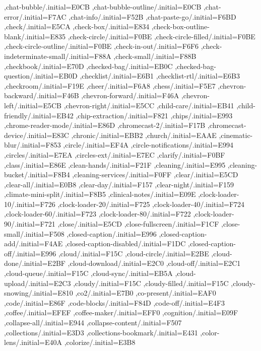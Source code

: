 { ,chat-bubble/.initial=E0CB
 ,chat-bubble-outline/.initial=E0CB
 ,chat-error/.initial=F7AC
 ,chat-info/.initial=F52B
 ,chat-paste-go/.initial=F6BD
 ,check/.initial=E5CA
 ,check-box/.initial=E834
 ,check-box-outline-blank/.initial=E835
 ,check-circle/.initial=F0BE
 ,check-circle-filled/.initial=F0BE
 ,check-circle-outline/.initial=F0BE
 ,check-in-out/.initial=F6F6
 ,check-indeterminate-small/.initial=F88A
 ,check-small/.initial=F88B
 ,checkbook/.initial=E70D
 ,checked-bag/.initial=EB0C
 ,checked-bag-question/.initial=EB0D
 ,checklist/.initial=E6B1
 ,checklist-rtl/.initial=E6B3
 ,checkroom/.initial=F19E
 ,cheer/.initial=F6A8
 ,chess/.initial=F5E7
 ,chevron-backward/.initial=F46B
 ,chevron-forward/.initial=F46A
 ,chevron-left/.initial=E5CB
 ,chevron-right/.initial=E5CC
 ,child-care/.initial=EB41
 ,child-friendly/.initial=EB42
 ,chip-extraction/.initial=F821
 ,chips/.initial=E993
 ,chrome-reader-mode/.initial=E86D
 ,chromecast-2/.initial=F17B
 ,chromecast-device/.initial=E83C
 ,chronic/.initial=EBB2
 ,church/.initial=EAAE
 ,cinematic-blur/.initial=F853
 ,circle/.initial=EF4A
 ,circle-notifications/.initial=E994
 ,circles/.initial=E7EA
 ,circles-ext/.initial=E7EC
 ,clarify/.initial=F0BF
 ,class/.initial=E86E
 ,clean-hands/.initial=F21F
 ,cleaning/.initial=E995
 ,cleaning-bucket/.initial=F8B4
 ,cleaning-services/.initial=F0FF
 ,clear/.initial=E5CD
 ,clear-all/.initial=E0B8
 ,clear-day/.initial=F157
 ,clear-night/.initial=F159
 ,climate-mini-split/.initial=F8B5
 ,clinical-notes/.initial=E09E
 ,clock-loader-10/.initial=F726
 ,clock-loader-20/.initial=F725
 ,clock-loader-40/.initial=F724
 ,clock-loader-60/.initial=F723
 ,clock-loader-80/.initial=F722
 ,clock-loader-90/.initial=F721
 ,close/.initial=E5CD
 ,close-fullscreen/.initial=F1CF
 ,close-small/.initial=F508
 ,closed-caption/.initial=E996
 ,closed-caption-add/.initial=F4AE
 ,closed-caption-disabled/.initial=F1DC
 ,closed-caption-off/.initial=E996
 ,cloud/.initial=F15C
 ,cloud-circle/.initial=E2BE
 ,cloud-done/.initial=E2BF
 ,cloud-download/.initial=E2C0
 ,cloud-off/.initial=E2C1
 ,cloud-queue/.initial=F15C
 ,cloud-sync/.initial=EB5A
 ,cloud-upload/.initial=E2C3
 ,cloudy/.initial=F15C
 ,cloudy-filled/.initial=F15C
 ,cloudy-snowing/.initial=E810
 ,co2/.initial=E7B0
 ,co-present/.initial=EAF0
 ,code/.initial=E86F
 ,code-blocks/.initial=F84D
 ,code-off/.initial=E4F3
 ,coffee/.initial=EFEF
 ,coffee-maker/.initial=EFF0
 ,cognition/.initial=E09F
 ,collapse-all/.initial=E944
 ,collapse-content/.initial=F507
 ,collections/.initial=E3D3
 ,collections-bookmark/.initial=E431
 ,color-lens/.initial=E40A
 ,colorize/.initial=E3B8
}
